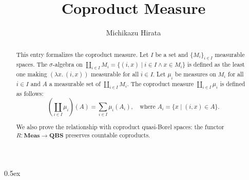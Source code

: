\documentclass[11pt,a4paper]{article}
\begin{document}
\title{Coproduct Measure}
\author{Michikazu Hirata}
\maketitle
\begin{abstract}
  This entry formalizes the coproduct measure.
  Let $I$ be a set and $\{M_i\}_{i\in I}$ measurable spaces.
  The $\sigma$-algebra
  on $\coprod_{i\in I} M_i = \{(i,x)\mid i\in I\land x\in M_i\}$
  is defined as the least one making $(\lambda x.\: (i,x))$ measurable for all $i\in I$.
  Let $\mu_i$ be measures on $M_i$ for all $i\in I$ and $A$ a measurable set of $\coprod_{i\in I} M_i$.
  The coproduct measure $\coprod_{i\in I} \mu_i$ is defined as follows:
  \[\left(\coprod_{i\in I} \mu_i\right)(A) = \sum_{i\in I} \mu_i(A_i), \quad \text{where $A_i = \{x\mid (i,x)\in A\}$.}\]

  We also prove the relationship with coproduct quasi-Borel spaces:
  the functor $R: \mathbf{Meas}\to\mathbf{QBS}$ preserves
  countable coproducts.
\end{abstract}

\tableofcontents

\parindent 0pt\parskip 0.5ex





\end{document}
